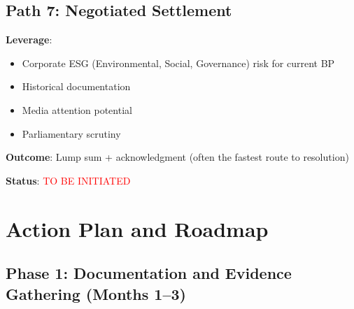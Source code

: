 \documentclass[11pt,a4paper]{article}
\begin{document}
\subsection{Path 7: Negotiated Settlement}

\begin{action}
\textbf{Leverage}:
\begin{itemize}
    \item Corporate ESG (Environmental, Social, Governance) risk for current BP
    \item Historical documentation
    \item Media attention potential
    \item Parliamentary scrutiny
\end{itemize}

\textbf{Outcome}: Lump sum + acknowledgment (often the fastest route to resolution)

\textbf{Status}: \textcolor{red}{TO BE INITIATED}
\end{action}

\newpage

\section{Action Plan and Roadmap}

\subsection{Phase 1: Documentation and Evidence Gathering (Months 1--3)}
\end{document}
